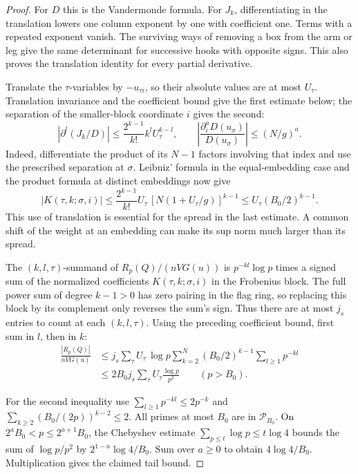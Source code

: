 \begin{proof}
For \(D\) this is the Vandermonde formula.
For \(J_k\), differentiating in the translation lowers one
column exponent by one with coefficient one. Terms with a
repeated exponent vanish. The surviving ways of removing
a box from the arm or leg give the same determinant for
successive hooks with opposite signs. This also proves the
translation identity for every partial derivative.

Translate the \(\tau\)-variables by \(-u_{\tau i}\), so their
absolute values are at most \(U_\tau\).
Translation invariance and the coefficient bound give the first
estimate below; the separation of the smaller-block coordinate \(i\)
gives the second:
\[
 \left|\partial^l(J_k/D)\right|
       \le \frac{2^{k-1}}{k!}k^l U_\tau^{k-l},\qquad
 \left|\frac{\partial_i^a D(u_\sigma)}{D(u_\sigma)}\right|\le(N/g)^a .
\] Indeed,
differentiate the product of its \(N-1\) factors involving
that index and use the prescribed separation at \(\sigma\).
Leibniz' formula in the equal-embedding case and the product
formula at distinct embeddings now give
\[
 |K(\tau,k;\sigma,i)|\le
 \frac{2^{k-1}}{k!}U_\tau\,[N(1+U_\tau/g)]^{k-1}
 \le U_\tau(B_0/2)^{k-1}.
\]
This use of translation is essential for the spread in the
last estimate. A common shift of the weight at an embedding
can make its sup norm much larger than its spread.

The \((k,l,\tau)\)-summand of \(R_p(Q)/(nVG(u))\) is
\(p^{-kl}\log p\) times a signed sum of the normalized
coefficients \(K(\tau,k;\sigma,i)\) in the Frobenius block.
The full power sum of degree \(k-1>0\) has zero pairing
in the flag ring, so replacing this block by its complement
only reverses the sum's sign. Thus there are at most \(j_s\)
entries to count at each \((k,l,\tau)\). Using the preceding
coefficient bound, first sum in \(l\), then in \(k\):
\[
 \begin{split}
 \frac{|R_p(Q)|}{nVG(u)}
 &\le j_s\sum_\tau U_\tau\,\log p
     \sum_{k=2}^{N}(B_0/2)^{k-1}\sum_{l\ge1}p^{-kl}\\
 &\le 2 B_0 j_s\sum_\tau U_\tau \frac{\log p}{p^2}
                                      \qquad(p>B_0).
 \end{split}
\]

For the second inequality use
\(\sum_{l\ge1}p^{-kl}\le2p^{-k}\) and
\(\sum_{k\ge2}(B_0/(2p))^{k-2}\le2\).
All primes at most \(B_0\) are in \(\mathcal P_{B_0}\).
On \(2^a B_0<p\le 2^{a+1}B_0\), the Chebyshev estimate
\(\sum_{p\le t}\log p\le t\log4\) bounds the sum of
\(\log p/p^2\) by \(2^{1-a}\log4/B_0\).
Sum over \(a\ge0\) to obtain \(4\log4/B_0\). Multiplication
gives the claimed tail bound.

\end{proof}

